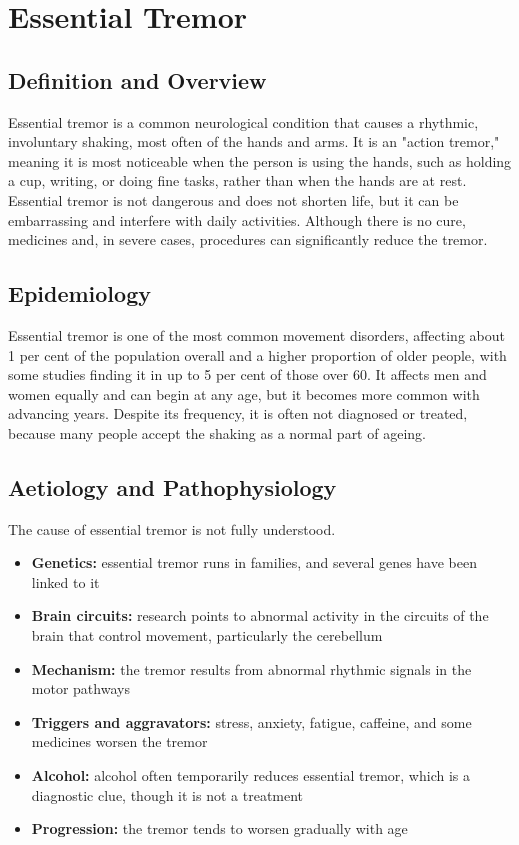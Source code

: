 \chapter{Essential Tremor}

\section*{Definition and Overview}
Essential tremor is a common neurological condition that causes a rhythmic, involuntary shaking, most often of the hands and arms. It is an "action tremor," meaning it is most noticeable when the person is using the hands, such as holding a cup, writing, or doing fine tasks, rather than when the hands are at rest. Essential tremor is not dangerous and does not shorten life, but it can be embarrassing and interfere with daily activities. Although there is no cure, medicines and, in severe cases, procedures can significantly reduce the tremor.

\section*{Epidemiology}
Essential tremor is one of the most common movement disorders, affecting about 1 per cent of the population overall and a higher proportion of older people, with some studies finding it in up to 5 per cent of those over 60. It affects men and women equally and can begin at any age, but it becomes more common with advancing years. Despite its frequency, it is often not diagnosed or treated, because many people accept the shaking as a normal part of ageing.

\section*{Aetiology and Pathophysiology}
The cause of essential tremor is not fully understood.
\begin{itemize}
    \item \textbf{Genetics:} essential tremor runs in families, and several genes have been linked to it
    \item \textbf{Brain circuits:} research points to abnormal activity in the circuits of the brain that control movement, particularly the cerebellum
    \item \textbf{Mechanism:} the tremor results from abnormal rhythmic signals in the motor pathways
    \item \textbf{Triggers and aggravators:} stress, anxiety, fatigue, caffeine, and some medicines worsen the tremor
    \item \textbf{Alcohol:} alcohol often temporarily reduces essential tremor, which is a diagnostic clue, though it is not a treatment
    \item \textbf{Progression:} the tremor tends to worsen gradually with age
\end{itemize}

